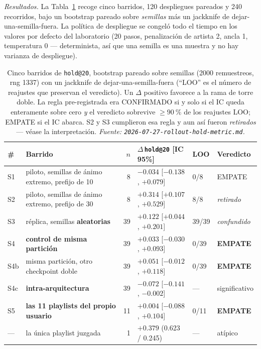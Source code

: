 \documentclass[11pt]{article}
\newcommand{\best}[1]{\textbf{#1}}
\begin{document}
\emph{Resultados.} La Tabla~\ref{tab:rollout} recoge cinco barridos, \num{120}
despliegues pareados y \num{240} recorridos, bajo un bootstrap pareado sobre
\emph{semillas} más un jackknife de dejar-una-semilla-fuera. La política de
despliegue se congeló todo el tiempo en los valores por defecto del laboratorio
(\num{20} pasos, penalización de artista \num{2}, ancla \num{1}, temperatura
\num{0} --- determinista, así que una semilla es una muestra y no hay varianza de
despliegue).

\begin{table}[ht]
  \centering
  \caption{Cinco barridos de \texttt{hold@20}, bootstrap pareado sobre semillas
  (\num{2000} remuestreos, rng \num{1337}) con un jackknife de
  dejar-una-semilla-fuera (``LOO'' es el número de reajustes que preservan el
  veredicto). Un $\Delta$ positivo favorece a la rama de torre doble. La regla
  pre-registrada era CONFIRMADO si y solo si el IC queda enteramente sobre cero
  \emph{y} el veredicto sobrevive $\ge\SI{90}{\percent}$ de los reajustes LOO;
  EMPATE si el IC abarca. S2 y S3 cumplieron esa regla y aun así fueron
  \emph{retirados} --- véase la interpretación.
  \emph{Fuente: \texttt{2026-07-27-rollout-hold-metric.md}.}}
  \label{tab:rollout}
  {\footnotesize\setlength{\tabcolsep}{4pt}\begin{tabular}{llrlll}
    \toprule
    \# & Barrido & $n$ & $\Delta$\,\texttt{hold@20} [IC 95\%] & LOO & Veredicto \\
    \midrule
    S1 & piloto, semillas de ánimo extremo, prefijo de 10 & 8 & $-0.034$ [$-0.138$, $+0.079$] & 0/8 & EMPATE \\
    S2 & piloto, semillas de ánimo extremo, prefijo de 30 & 8 & $+0.314$ [$+0.107$, $+0.529$] & 8/8 & \emph{retirado} \\
    S3 & réplica, semillas \textbf{aleatorias} & 39 & $+0.122$ [$+0.044$, $+0.201$] & 39/39 & \emph{confundido} \\
    S4 & \textbf{control de misma partición} & 39 & $+0.033$ [$-0.030$, $+0.093$] & 0/39 & \best{EMPATE} \\
    S4b & misma partición, otro checkpoint doble & 39 & $+0.051$ [$-0.012$, $+0.118$] & 0/39 & \best{EMPATE} \\
    S4c & \textbf{intra-arquitectura} & 39 & $-0.072$ [$-0.141$, $-0.002$] & --- & significativo \\
    S5 & \textbf{las \num{11} playlists del propio usuario} & 11 & $+0.004$ [$-0.088$, $+0.104$] & 0/11 & \best{EMPATE} \\
    --- & la única playlist juzgada & 1 & $+0.379$ (\num{0.623} / \num{0.245}) & --- & atípico \\
    \bottomrule
  \end{tabular}}
\end{table}
\end{document}

